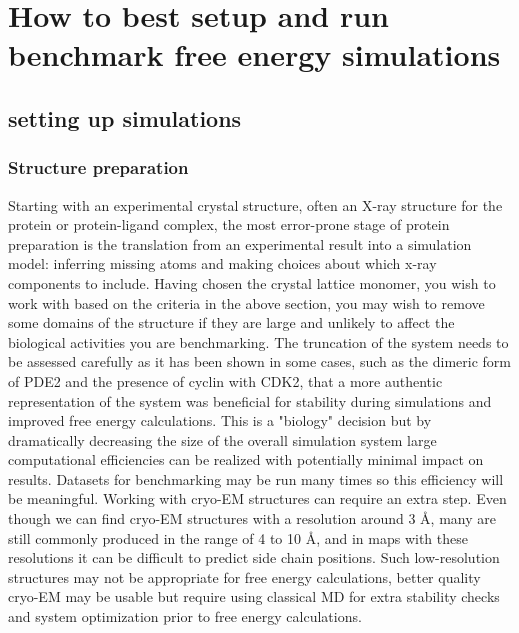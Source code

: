 \documentclass[9pt,bestpractices]{livecoms}
\begin{document}
\section{How to best setup and run benchmark free energy simulations}

\subsection{setting up simulations}
\label{sec:setup}


\subsubsection{Structure preparation}
\label{sec:prep}

Starting with an experimental crystal structure, often an X-ray structure for the protein or protein-ligand complex, the most error-prone stage of protein preparation is the translation from an experimental result into a simulation model: inferring missing atoms and making choices about which x-ray components to include. Having chosen the crystal lattice monomer, you wish to work with based on the criteria in the above section, you may wish to remove some domains of the structure if they are large and unlikely to affect the biological activities you are benchmarking. The truncation of the system needs to be assessed carefully as it has been shown in some cases, such as the dimeric form of PDE2 and the presence of cyclin with CDK2, that a more authentic representation of the system was beneficial for stability during simulations and improved free energy calculations. This is a "biology" decision but by dramatically decreasing the size of the overall simulation system large computational efficiencies can be realized with potentially minimal impact on results. Datasets for benchmarking may be run many times so this efficiency will be meaningful. Working with cryo-EM structures can require an extra step. Even though we can find cryo-EM structures with a resolution around 3 Å, many are still commonly produced in the range of 4 to 10 Å, and in maps with these resolutions it can be difficult to predict side chain positions. Such low-resolution structures may not be appropriate for free energy calculations, better quality cryo-EM may be usable but require using classical MD for extra stability checks and system optimization prior to free energy calculations.
\end{document}
